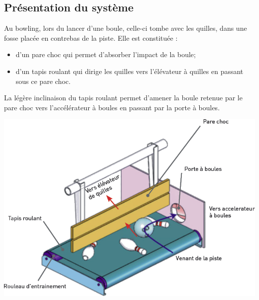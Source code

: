 \documentclass[10pt,fleqn]{article} %
\begin{document}
\def\pathfig{images}

\vspace{4.5cm}
\pagestyle{fancy}
\thispagestyle{plain}

\def\columnseprulecolor{\color{ocre}}
\setlength{\columnseprule}{0.4pt} 

\def\pathfig{images}

\ifprof
\else
\begin{multicols}{2}
\fi


\subsection*{Présentation du système}
Au bowling, lors du lancer d’une boule, celle-ci tombe avec les quilles, dans une fosse placée
en contrebas de la piste. Elle est constituée :
\begin{itemize}
\item d'un pare choc qui permet d'absorber l'impact de la boule;
\item d'un tapis roulant qui dirige les quilles vers l'élévateur à quilles en passant sous
ce pare choc.
\end{itemize}
La légère inclinaison du tapis roulant permet d'amener la boule retenue par le pare choc
vers l'accélérateur à boules en passant par la porte à boules.

\begin{center}
\includegraphics[width=\linewidth]{images/fig_01}
\end{center}


\end{multicols}
\end{document}
